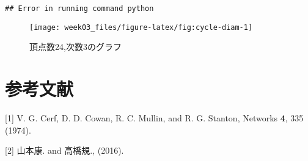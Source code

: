 \documentclass[xelatex,ja=standard,11pt]{bxjsarticle}
\begin{document}
\begin{verbatim}
## Error in running command python
\end{verbatim}

\begin{figure}

{\centering \texttt{[image: week03\_files/figure-latex/fig:cycle-diam-1]} 

}

\caption{頂点数24,次数3のグラフ}\label{fig:fig:cycle-diam}
\end{figure}

\section*{参考文献}

\hypertarget{refs}{}
\hypertarget{ref-Cerf1974}{}
{[}1{]} V. G. Cerf, D. D. Cowan, R. C. Mullin, and R. G. Stanton,
Networks \textbf{4}, 335 (1974).

\hypertarget{ref-Yamamoto2016}{}
{[}2{]} 山本康. and 高橋規., (2016).
\end{document}
